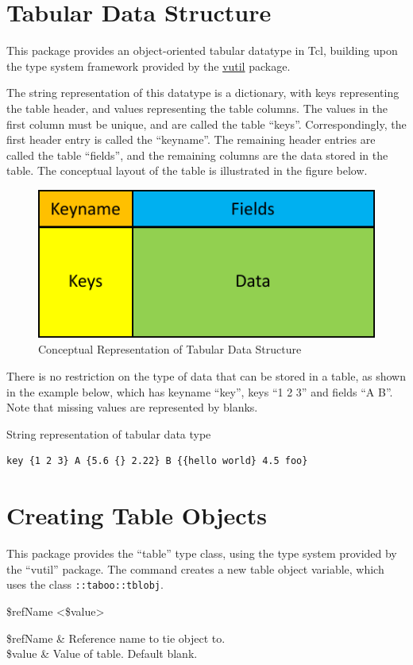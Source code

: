 
\section{Tabular Data Structure}
This package provides an object-oriented tabular datatype in Tcl, building upon the type system framework provided by the \textcolor{blue}{\href{https://github.com/ambaker1/vutil}{vutil}} package.

The string representation of this datatype is a dictionary, with keys representing the table header, and values representing the table columns.
The values in the first column must be unique, and are called the table ``keys''. 
Correspondingly, the first header entry is called the ``keyname''. 
The remaining header entries are called the table ``fields'', and the remaining columns are the data stored in the table.
The conceptual layout of the table is illustrated in the figure below.
\vspace{\baselineskip}
\FloatBarrier
\begin{figure}[!htb]
    \centering
    \includegraphics{figures/table.pdf}
    \caption{Conceptual Representation of Tabular Data Structure}
    \label{fig:table_props}
\end{figure}
There is no restriction on the type of data that can be stored in a table, as shown in the example below, which has keyname ``key'', keys ``1 2 3'' and fields ``A B''.
Note that missing values are represented by blanks. 
\begin{example}{String representation of tabular data type}
\begin{lstlisting}
key {1 2 3} A {5.6 {} 2.22} B {{hello world} 4.5 foo}
\end{lstlisting}
\end{example}

\clearpage
\section{Creating Table Objects}
This package provides the ``table'' type class, using the type system provided by the ``vutil'' package. 
The command  creates a new table object variable, which uses the class \texttt{::taboo::tblobj}.
\begin{syntax}
 \$refName <\$value>
\end{syntax}
\begin{args}
\$refName & Reference name to tie object to. \\
\$value & Value of table. Default blank.
\end{args}

